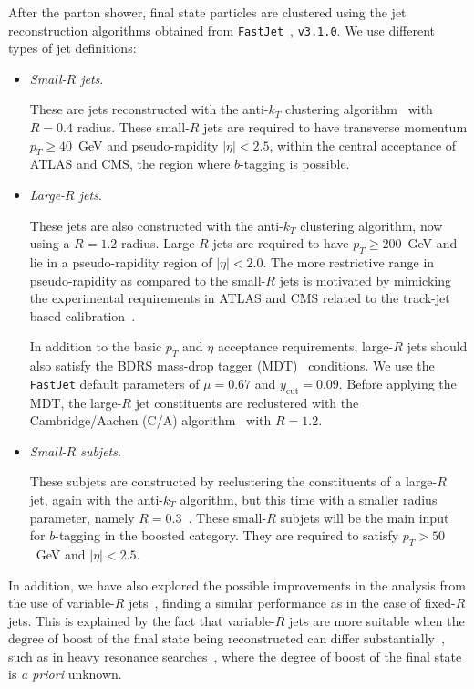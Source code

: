 After the  parton shower, final state particles
are clustered using the
jet reconstruction algorithms
obtained from
{\tt FastJet}~\cite{Cacciari:2011ma,Cacciari:2005hq},
{\tt v3.1.0}.
%
We use different types of jet definitions:
\begin{itemize}
\item {\it Small-$R$ jets}.

  These are jets  reconstructed with the
  anti-$k_T$ clustering algorithm~\cite{Cacciari:2008gp} with $R=0.4$ radius.
  These small-$R$ jets are required
  to have transverse momentum $p_T \ge 40$~GeV
  and pseudo-rapidity $|\eta|<2.5$, within the central 
  acceptance of ATLAS and CMS, the region
  where $b$-tagging is possible.

\item {\it Large-$R$ jets}.

  These jets are also constructed with the
  anti-$k_T$ clustering algorithm, now using a $R=1.2$ radius.
  Large-$R$ jets are required to have
  $p_T \ge 200$~GeV and lie in a pseudo-rapidity region of
  $|\eta|<2.0$.
  The more restrictive range  in pseudo-rapidity
  as compared to the small-$R$ jets
  is motivated by mimicking the  experimental requirements
  in ATLAS and CMS
  related to the track-jet based calibration~\cite{Aad:2014bia,ATLAS:2012kla}.

  In addition to the basic $p_T$ and $\eta$
  acceptance requirements, large-$R$ jets should also
  satisfy the  BDRS mass-drop tagger (MDT)~\cite{Butterworth:2008iy}
  conditions.
  We use the {\tt FastJet} default
  parameters of  $\mu = 0.67$ and $y_{\textrm{cut}}= 0.09$.
  Before applying the MDT, the large-$R$ jet
  constituents are reclustered with the Cambridge/Aachen (C/A)
  algorithm~\cite{Dokshitzer:1997in,Wobisch:1998wt}
  with $R=1.2$.

  
\item {\it Small-$R$ subjets}.

  These subjets are constructed by reclustering the constituents
  of a large-$R$ jet, again with the
  anti-$k_T$ algorithm,
  but this time with a smaller radius parameter, namely
  $R=0.3$~\cite{Aad:2015uka}.
  These small-$R$ subjets will be the main input for
  $b$-tagging in the boosted category.
  They are required to satisfy $p_T > 50$~GeV and $|\eta|<2.5$.
\end{itemize}

In addition, we have
also explored the possible improvements
in the analysis from the use
of variable-$R$ jets~\cite{Krohn:2009zg}, finding
a similar performance as in the case of fixed-$R$ jets.
%
This is explained by the fact that
variable-$R$ jets are more suitable when
the degree of boost of the final state being reconstructed can
differ substantially~\cite{Cacciari:2008gd},
such as in heavy resonance
searches~\cite{Aad:2015fna},
where the degree of boost of the final state
is {\it a priori} unknown.


